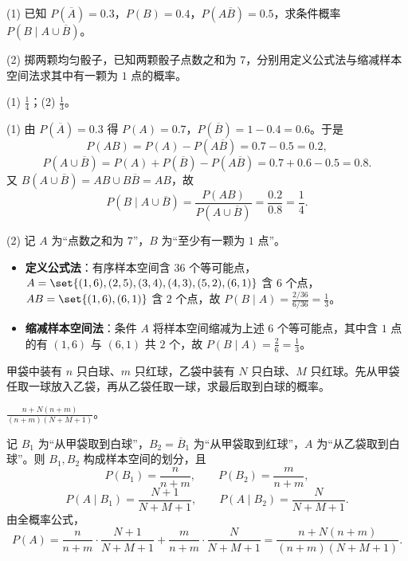 \begin{exercise}[title={条件概率与缩减样本空间},level=standard,points=8,tags={条件概率,古典概型}]
(1) 已知 $P(\overline{A})=0.3$，$P(B)=0.4$，$P(A\overline{B})=0.5$，求条件概率 $P(B\mid A\cup\overline{B})$。

(2) 掷两颗均匀骰子，已知两颗骰子点数之和为 $7$，分别用定义公式法与缩减样本空间法求其中有一颗为 $1$ 点的概率。
\begin{answer}
(1) $\frac{1}{4}$；(2) $\frac{1}{3}$。
\end{answer}
\begin{solution}
(1) 由 $P(\overline{A})=0.3$ 得 $P(A)=0.7$，$P(\overline{B})=1-0.4=0.6$。于是
\[
  P(AB)=P(A)-P(A\overline{B})=0.7-0.5=0.2,
\]
\[
  P(A\cup\overline{B})=P(A)+P(\overline{B})-P(A\overline{B})=0.7+0.6-0.5=0.8.
\]
又 $B(A\cup\overline{B})=AB\cup B\overline{B}=AB$，故
\[
  P(B\mid A\cup\overline{B})=\frac{P(AB)}{P(A\cup\overline{B})}=\frac{0.2}{0.8}=\frac{1}{4}.
\]

(2) 记 $A$ 为“点数之和为 $7$”，$B$ 为“至少有一颗为 $1$ 点”。
\begin{itemize}
  \item \textbf{定义公式法}：有序样本空间含 $36$ 个等可能点，$A=\set{(1,6),(2,5),(3,4),(4,3),(5,2),(6,1)}$ 含 $6$ 个点，$AB=\set{(1,6),(6,1)}$ 含 $2$ 个点，故 $P(B\mid A)=\frac{2/36}{6/36}=\frac{1}{3}$。
  \item \textbf{缩减样本空间法}：条件 $A$ 将样本空间缩减为上述 $6$ 个等可能点，其中含 $1$ 点的有 $(1,6)$ 与 $(6,1)$ 共 $2$ 个，故 $P(B\mid A)=\frac{2}{6}=\frac{1}{3}$。
\end{itemize}
\end{solution}
\end{exercise}

\begin{exercise}[title={两袋转移摸球},level=standard,points=8,tags={全概率公式}]
甲袋中装有 $n$ 只白球、$m$ 只红球，乙袋中装有 $N$ 只白球、$M$ 只红球。先从甲袋任取一球放入乙袋，再从乙袋任取一球，求最后取到白球的概率。
\begin{answer}
$\frac{n+N(n+m)}{(n+m)(N+M+1)}$。
\end{answer}
\begin{solution}
记 $B_1$ 为“从甲袋取到白球”，$B_2=\overline{B}_1$ 为“从甲袋取到红球”，$A$ 为“从乙袋取到白球”。则 $B_1,B_2$ 构成样本空间的划分，且
\[
  P(B_1)=\frac{n}{n+m},\qquad P(B_2)=\frac{m}{n+m},
\]
\[
  P(A\mid B_1)=\frac{N+1}{N+M+1},\qquad P(A\mid B_2)=\frac{N}{N+M+1}.
\]
由全概率公式，
\[
  P(A)=\frac{n}{n+m}\cdot\frac{N+1}{N+M+1}+\frac{m}{n+m}\cdot\frac{N}{N+M+1}
  =\frac{n+N(n+m)}{(n+m)(N+M+1)}.
\]
\end{solution}
\end{exercise}

